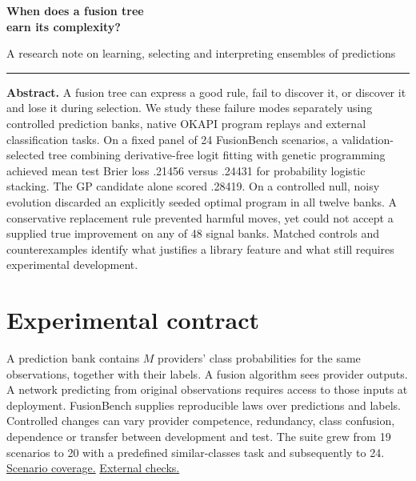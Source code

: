 \documentclass[10pt,a4paper]{article}
\newcommand{\FB}[2]{\href{https://github.com/damiankucharski/fusionbench/blob/5f9254e0c6e4559d7c0d19f28dc91641fba09d57/docs/ensemble-study/#1}{#2}}
\begin{document}
\thispagestyle{empty}
\par
\vspace{1em}
{\noindent\sffamily\bfseries\fontsize{26}{30}\selectfont When does a fusion tree\\earn its complexity?\par}
\vspace{.5em}
{\noindent\large A research note on learning, selecting and interpreting ensembles of predictions\par}
\vspace{.85em}\hrule\vspace{.8em}
\noindent\textbf{Abstract.}
A fusion tree can express a good rule, fail to discover it, or discover it and lose it during selection. We study these failure modes separately using controlled prediction banks, native OKAPI program replays and external classification tasks. On a fixed panel of 24 FusionBench scenarios, a validation-selected tree combining derivative-free logit fitting with genetic programming achieved mean test Brier loss .21456 versus .24431 for probability logistic stacking. The GP candidate alone scored .28419. On a controlled null, noisy evolution discarded an explicitly seeded optimal program in all twelve banks. A conservative replacement rule prevented harmful moves, yet could not accept a supplied true improvement on any of 48 signal banks. Matched controls and counterexamples identify what justifies a library feature and what still requires experimental development.

\section{Experimental contract}
A prediction bank contains $M$ providers' class probabilities for the same observations, together with their labels. A fusion algorithm sees provider outputs. A network predicting from original observations requires access to those inputs at deployment. FusionBench supplies reproducible laws over predictions and labels. Controlled changes can vary provider competence, redundancy, class confusion, dependence or transfer between development and test. The suite grew from 19 scenarios to 20 with a predefined similar-classes task and subsequently to 24. \FB{scenario-coverage/README.md}{Scenario coverage.} \FB{external-coverage/README.md}{External checks.}
\end{document}
